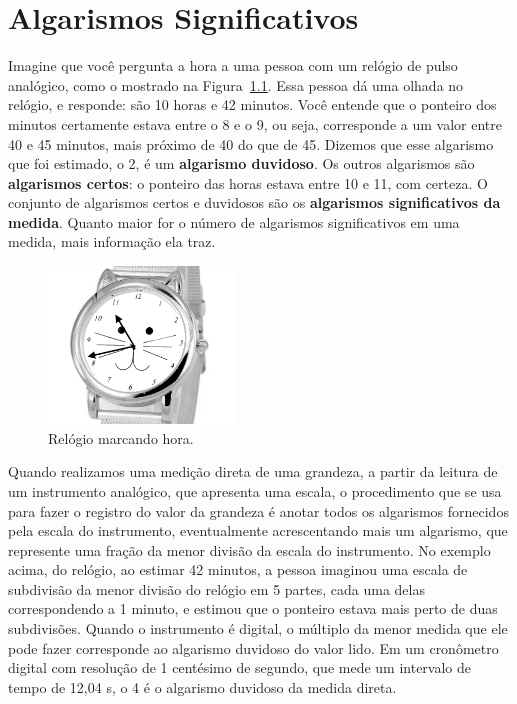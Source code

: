 \chapter{Algarismos Significativos}
\label{algSig}
\vspace{-0.5cm}
Imagine que você pergunta a hora a uma pessoa com um relógio de pulso analógico, como o mostrado na Figura~\ref{fig:relogio}. Essa pessoa dá uma olhada no relógio,  e responde: são 10 horas e 42 minutos. Voc\^e entende que o ponteiro dos minutos certamente estava entre o 8 e o 9, ou seja, corresponde a um valor entre 40 e 45 minutos, mais pr\'oximo de 40 do que de 45. Dizemos que esse algarismo que foi estimado, o 2,  \'e um {\bf algarismo duvidoso}. Os outros algarismos são {\bf algarismos certos}: o ponteiro das horas estava entre 10 e 11, com certeza. O conjunto de algarismos certos e duvidosos são os {\bf algarismos significativos da medida}. Quanto maior for o número de algarismos significativos em uma medida, mais informação ela traz. 

\vspace{-0.5cm}
\begin{figure}[hp!]
\begin{center}
\includegraphics[width=5cm]{fig/relogioHoraPB}
\caption{Relógio marcando hora.}
\label{fig:relogio}
\end{center}
\end{figure}
\vspace{-0.5cm}
Quando realizamos uma medi\c c\~ao direta de uma grandeza, a partir da leitura de um instrumento anal\'ogico, que apresenta uma escala, o procedimento que se usa para fazer o registro do valor da grandeza \'e anotar todos os algarismos fornecidos pela escala do instrumento, eventualmente acrescentando mais um algarismo, que represente uma fra\c c\~ao da menor divis\~ao da escala do instrumento. No exemplo acima, do rel\'ogio, ao estimar 42 minutos, a pessoa imaginou uma escala de subdivis\~ao da menor divis\~ao do rel\'ogio em 5 partes, cada uma delas correspondendo a 1 minuto, e estimou que o ponteiro estava mais perto de duas subdivis\~oes. Quando o instrumento \'e digital, o m\'ultiplo da menor medida que ele pode fazer corresponde ao algarismo duvidoso do valor lido. Em um cron\^ometro digital com resolu\c c\~ao de 1 cent\'esimo de segundo, que mede um intervalo de tempo de 12,04 s, o 4 \'e o algarismo duvidoso da medida direta.

